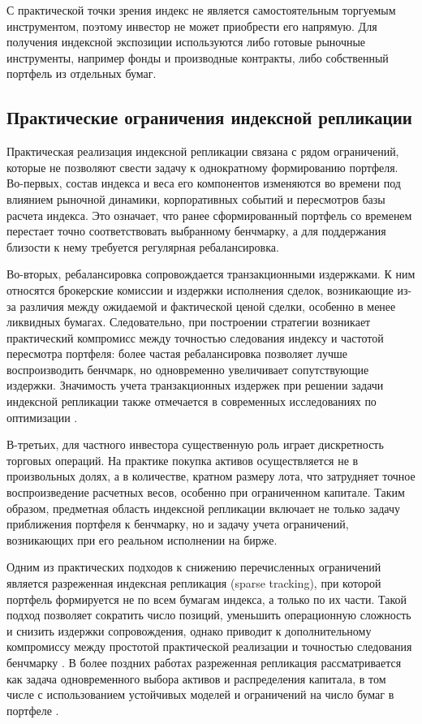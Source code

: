 \documentclass[14pt]{gost-7-32}
\begin{document}
С практической точки зрения индекс не является самостоятельным торгуемым инструментом, поэтому инвестор не может приобрести его напрямую. Для получения индексной экспозиции используются либо готовые рыночные инструменты, например фонды и производные контракты, либо собственный портфель из отдельных бумаг. 

\subsection{Практические ограничения индексной репликации}

Практическая реализация индексной репликации связана с рядом ограничений, которые не позволяют свести задачу к однократному формированию портфеля. Во-первых, состав индекса и веса его компонентов изменяются во времени под влиянием рыночной динамики, корпоративных событий и пересмотров базы расчета индекса. Это означает, что ранее сформированный портфель со временем перестает точно соответствовать выбранному бенчмарку, а для поддержания близости к нему требуется регулярная ребалансировка.

Во-вторых, ребалансировка сопровождается транзакционными издержками. К ним относятся брокерские комиссии и издержки исполнения сделок, возникающие из-за различия между ожидаемой и фактической ценой сделки, особенно в менее ликвидных бумагах. Следовательно, при построении стратегии возникает практический компромисс между точностью следования индексу и частотой пересмотра портфеля: более частая ребалансировка позволяет лучше воспроизводить бенчмарк, но одновременно увеличивает сопутствующие издержки. Значимость учета транзакционных издержек при решении задачи индексной репликации также отмечается в современных исследованиях по оптимизации \cite{hamiltonRussellTransactionCosts2024}.

В-третьих, для частного инвестора существенную роль играет дискретность торговых операций. На практике покупка активов осуществляется не в произвольных долях, а в количестве, кратном размеру лота, что затрудняет точное воспроизведение расчетных весов, особенно при ограниченном капитале. Таким образом, предметная область индексной репликации включает не только задачу приближения портфеля к бенчмарку, но и задачу учета ограничений, возникающих при его реальном исполнении на бирже.

Одним из практических подходов к снижению перечисленных ограничений является разреженная индексная репликация (sparse tracking), при которой портфель формируется не по всем бумагам индекса, а только по их части. Такой подход позволяет сократить число позиций, уменьшить операционную сложность и снизить издержки сопровождения, однако приводит к дополнительному компромиссу между простотой практической реализации и точностью следования бенчмарку \cite{benidisIndexTracking2018}. В более поздних работах разреженная репликация рассматривается как задача одновременного выбора активов и распределения капитала, в том числе с использованием устойчивых моделей и ограничений на число бумаг в портфеле \cite{liRobustSparsePortfolios2024,yamagataSparseIndexTracking2024}.
\end{document}
